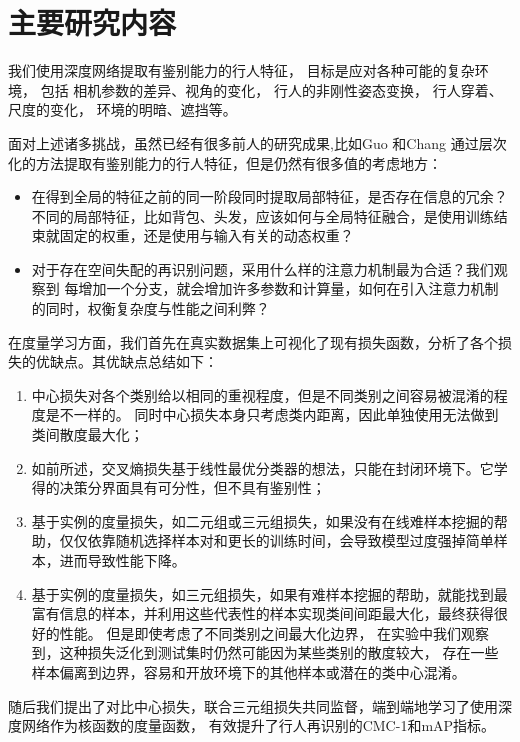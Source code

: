 \section{主要研究内容}

我们使用深度网络提取有鉴别能力的行人特征，
目标是应对各种可能的复杂环境，
包括
相机参数的差异、视角的变化，
行人的非刚性姿态变换，
行人穿着、尺度的变化，
环境的明暗、遮挡等。

面对上述诸多挑战，虽然已经有很多前人的研究成果,比如Guo \etal\cite{guo2018multilevel}和Chang \etal\cite{chang2018factor}通过层次化的方法提取有鉴别能力的行人特征，但是仍然有很多值的考虑地方：

\begin{itemize}
	\item \cite{zhao2017part} 在得到全局的特征之前的同一阶段同时提取局部特征，是否存在信息的冗余？
	      不同的局部特征，比如背包、头发，应该如何与全局特征融合，是使用训练结束就固定的权重，还是使用与输入有关的动态权重？
	\item 对于存在空间失配的再识别问题，采用什么样的注意力机制最为合适？我们观察到\cite{zhao2017part} 每增加一个分支，就会增加许多参数和计算量，如何在引入注意力机制的同时，权衡复杂度与性能之间利弊？
\end{itemize}

在度量学习方面，我们首先在真实数据集上可视化了现有损失函数，分析了各个损失的优缺点。其优缺点总结如下：
\begin{enumerate}
	\item 中心损失对各个类别给以相同的重视程度，但是不同类别之间容易被混淆的程度是不一样的。
	同时中心损失本身只考虑类内距离，因此单独使用无法做到类间散度最大化；
\item 
如前所述，交叉熵损失基于线性最优分类器的想法，只能在封闭环境下。它学得的决策分界面具有可分性，但不具有鉴别性；
\item 
基于实例的度量损失，如二元组或三元组损失，如果没有在线难样本挖掘的帮助\cite{yaqing2016semantics}，仅仅依靠随机选择样本对和更长的训练时间，会导致模型过度强掉简单样本，进而导致性能下降。
\item 
基于实例的度量损失，如三元组损失，如果有难样本挖掘的帮助，就能找到最富有信息的样本，并利用这些代表性的样本实现类间间距最大化，最终获得很好的性能。
但是即使考虑了不同类别之间最大化边界，
在实验中我们观察到，这种损失泛化到测试集时仍然可能因为某些类别的散度较大，
存在一些样本偏离到边界，容易和开放环境下的其他样本或潜在的类中心混淆。
\end{enumerate}

随后我们提出了对比中心损失，联合三元组损失共同监督，端到端地学习了使用深度网络作为核函数的度量函数，
有效提升了行人再识别的CMC-1和mAP指标。

